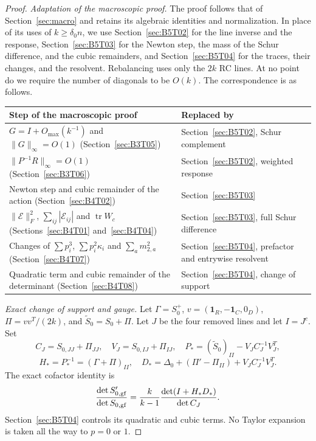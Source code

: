 \begin{proof}
\emph{Adaptation of the macroscopic proof.}
The proof follows that of Section~\ref{sec:macro} and retains its algebraic identities and normalization.
In place of its uses of $k\ge\delta_0n$, we use Section~\ref{sec:B5T02} for the line inverse
and the response, Section~\ref{sec:B5T03} for the Newton step, the mass of the Schur difference,
and the cubic remainders, and Section~\ref{sec:B5T04} for the traces, their changes, and the resolvent.
Rebalancing uses only the $2k$ RC lines.
At no point do we require the number of diagonals to be $O(k)$. The correspondence is as follows.
\begin{center}
\renewcommand{\arraystretch}{1.25}
\begin{tabular}{@{}>{\raggedright\arraybackslash}p{}
                >{\raggedright\arraybackslash}p{}@{}}
\toprule
Step of the macroscopic proof & Replaced by\\
\midrule
$G=I+O_{\max}(k^{-1})$ and $\|G\|_\infty=O(1)$ (Section~\ref{sec:B3T05}) &
 Section~\ref{sec:B5T02}, Schur complement\\
$\|P^{-1}R\|_\infty=O(1)$ (Section~\ref{sec:B3T06}) &
 Section~\ref{sec:B5T02}, weighted response\\
Newton step and cubic remainder of the action (Section~\ref{sec:B4T02}) &
 Section~\ref{sec:B5T03}\\
$\|\mathcal E\|_F^2$, $\sum_{ij}|\mathcal E_{ij}|$ and $\operatorname{tr}W_c$
 (Sections~\ref{sec:B4T01} and~\ref{sec:B4T04}) &
 Section~\ref{sec:B5T03}, full Schur difference\\
Changes of $\sum p_i^3$, $\sum p_i^2\kappa_i$ and $\sum_am_{2,a}^2$ (Section~\ref{sec:B4T07}) &
 Section~\ref{sec:B5T04}, prefactor and entrywise resolvent\\
Quadratic term and cubic remainder of the determinant (Section~\ref{sec:B4T08}) &
 Section~\ref{sec:B5T04}, change of support\\
\bottomrule
\end{tabular}
\end{center}

\par\emph{Exact change of support and gauge.}
Let $\Gamma=S_0^+$, $v=(\mathbf1_R,-\mathbf1_C,0_D)$,
$\Pi=vv^T/(2k)$, and $\widetilde S_0=S_0+\Pi$.
Let $J$ be the four removed lines and let $I=J^c$. Set
\[
 C_J=S_{0,JJ}+\Pi_{JJ},\quad V_J=S_{0,IJ}+\Pi_{IJ},
 \quad P_*=(\widetilde S_0)_{II}-V_JC_J^{-1}V_J^T,
\]
\[
 H_*=P_*^{-1}=(\Gamma+\Pi)_{II},\quad
 D_*=\Delta_0+(\Pi'-\Pi_{II})+V_JC_J^{-1}V_J^T.
\]
The exact cofactor identity is
\[
 \frac{\det S'_{0,\rm gf}}{\det S_{0,\rm gf}}
 =\frac{k}{k-1}\frac{\det(I+H_*D_*)}{\det C_J}.
\]
Section~\ref{sec:B5T04} controls its quadratic and cubic terms. No Taylor expansion is taken
all the way to $p=0$ or $1$.


\end{proof}

